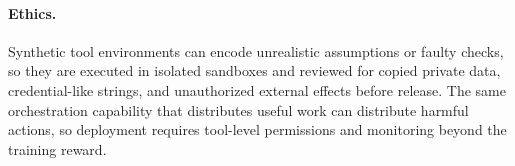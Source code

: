 \paragraph{Ethics.}
Synthetic tool environments can encode unrealistic assumptions or faulty checks, so they are executed in isolated sandboxes and reviewed for copied private data, credential-like strings, and unauthorized external effects before release.
The same orchestration capability that distributes useful work can distribute harmful actions, so deployment requires tool-level permissions and monitoring beyond the training reward.
